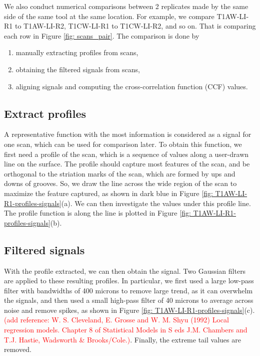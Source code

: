 \documentclass[fleqn,10pt]{wlscirep}
\begin{document}
We also conduct numerical comparisons between 2 replicates made by the
same side of the same tool at the same location. For example, we compare
T1AW-LI-R1 to T1AW-LI-R2, T1CW-LI-R1 to T1CW-LI-R2, and so on. That is
comparing each row in Figure \ref{fig: scans_pair}. The comparison is
done by

\begin{enumerate}
  \item
  manually extracting profiles from scans,

  \item
  obtaining the filtered signals from scans,
  
  \item
  aligning signals and computing the cross-correlation function (CCF) values.
\end{enumerate}

\subsection*{Extract profiles}

A representative function with the most information is considered as a
signal for one scan, which can be used for comparison later. To obtain
this function, we first need a profile of the scan, which is a sequence
of values along a user-drawn line on the surface. The profile should
capture most features of the scan, and be orthogonal to the striation
marks of the scan, which are formed by ups and downs of grooves. So, we
draw the line across the wide region of the scan to maximize the feature
captured, as shown in dark blue in Figure
\ref{fig: T1AW-LI-R1-profiles-signals}(a). We can then investigate the
values under this profile line. The profile function is along the line
is plotted in Figure \ref{fig: T1AW-LI-R1-profiles-signals}(b).

\subsection*{Filtered signals}

With the profile extracted, we can then obtain the signal. Two Gaussian
filters are applied to these resulting profiles. In particular, we first
used a large low-pass filter with bandwidths of 400 microns to remove
large trend, as it can overwhelm the signals, and then used a small
high-pass filter of 40 microns to average across noise and remove
spikes, as shown in Figure \ref{fig: T1AW-LI-R1-profiles-signals}(c).
\textcolor{red}{(add reference: W. S. Cleveland, E. Grosse and W. M. Shyu (1992) Local regression models. Chapter 8 of Statistical Models in S eds J.M. Chambers and T.J. Hastie, Wadsworth \& Brooks/Cole.)}.
Finally, the extreme tail values are removed.
\end{document}
